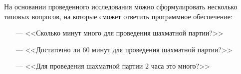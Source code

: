 \pagebreak
На основании проведенного исследования можно сформулировать несколько типовых вопросов, на которые сможет ответить программное обеспечение:
\begin{itemize}
	\item[---] <<Сколько минут много для проведения шахматной партии?>>
	\item[---] <<Достаточно ли  60 минут для проведения шахматной партии?>>
	\item[---] <<Для проведения шахматной партии 2 часа это много?>>
\end{itemize}
